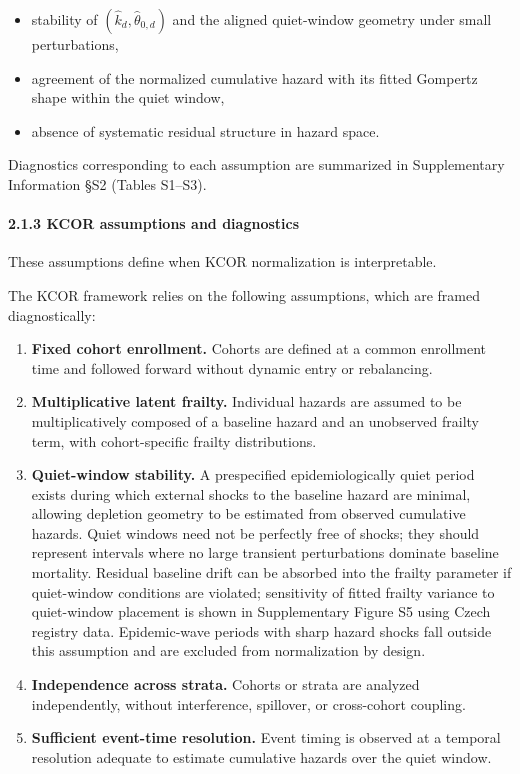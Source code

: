 \documentclass[
]{article}
\providecommand{\tightlist}{%
  \setlength{\itemsep}{0pt}\setlength{\parskip}{0pt}}
\begin{document}
\begin{itemize}
\tightlist
\item
  stability of \((\hat{k}_d,\hat{\theta}_{0,d})\) and the aligned quiet-window geometry under small perturbations,
\item
  agreement of the normalized cumulative hazard with its fitted Gompertz shape within the quiet window,
\item
  absence of systematic residual structure in hazard space.
\end{itemize}

Diagnostics corresponding to each assumption are summarized in Supplementary Information §S2 (Tables S1--S3).

\paragraph{2.1.3 KCOR assumptions and diagnostics}\label{kcor-assumptions-and-diagnostics}

These assumptions define when KCOR normalization is interpretable.

The KCOR framework relies on the following assumptions, which are framed diagnostically:

\begin{enumerate}
\def\labelenumi{\arabic{enumi}.}
\item
  \textbf{Fixed cohort enrollment.} Cohorts are defined at a common enrollment time and followed forward without dynamic entry or rebalancing.
\item
  \textbf{Multiplicative latent frailty.} Individual hazards are assumed to be multiplicatively composed of a baseline hazard and an unobserved frailty term, with cohort-specific frailty distributions.
\item
  \textbf{Quiet-window stability.} A prespecified epidemiologically quiet period exists during which external shocks to the baseline hazard are minimal, allowing depletion geometry to be estimated from observed cumulative hazards. Quiet windows need not be perfectly free of shocks; they should represent intervals where no large transient perturbations dominate baseline mortality. Residual baseline drift can be absorbed into the frailty parameter if quiet-window conditions are violated; sensitivity of fitted frailty variance to quiet-window placement is shown in Supplementary Figure S5 using Czech registry data. Epidemic-wave periods with sharp hazard shocks fall outside this assumption and are excluded from normalization by design.
\item
  \textbf{Independence across strata.} Cohorts or strata are analyzed independently, without interference, spillover, or cross-cohort coupling.
\item
  \textbf{Sufficient event-time resolution.} Event timing is observed at a temporal resolution adequate to estimate cumulative hazards over the quiet window.
\end{enumerate}
\end{document}
